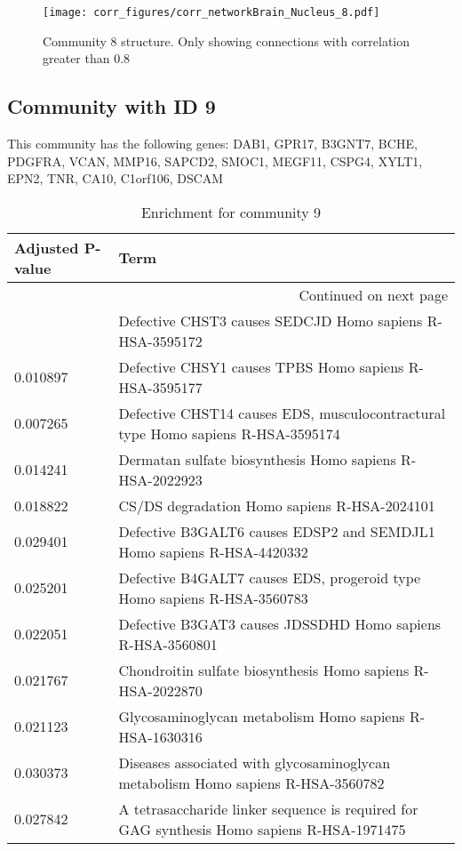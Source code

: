 \begin{figure}[h!]
\centering
\texttt{[image: corr\_figures/corr\_networkBrain\_Nucleus\_8.pdf]}
\caption{Community 8 structure. Only showing connections with correlation greater than 0.8}
\end{figure}




\subsection*{Community with ID 9}
This community has the following genes: DAB1, GPR17, B3GNT7, BCHE, PDGFRA, VCAN, MMP16, SAPCD2, SMOC1, MEGF11, CSPG4, XYLT1, EPN2, TNR, CA10, C1orf106, DSCAM
\\
\begin{longtable}{p{2.4cm}p{14.5cm}}
\caption{Enrichment for community 9}\\
\toprule
Adjusted \newline P-value &                                                                                        Term \\
\midrule
\endhead
\midrule
\multicolumn{2}{r}{{Continued on next page}} \\
\midrule
\endfoot

\bottomrule
\endlastfoot
                 0.021794 &                                    Defective CHST3 causes SEDCJD Homo sapiens R-HSA-3595172 \\
                 0.010897 &                                      Defective CHSY1 causes TPBS Homo sapiens R-HSA-3595177 \\
                 0.007265 &            Defective CHST14 causes EDS, musculocontractural type Homo sapiens R-HSA-3595174 \\
                 0.014241 &                                    Dermatan sulfate biosynthesis Homo sapiens R-HSA-2022923 \\
                 0.018822 &                                                CS/DS degradation Homo sapiens R-HSA-2024101 \\
                 0.029401 &                       Defective B3GALT6 causes EDSP2 and SEMDJL1 Homo sapiens R-HSA-4420332 \\
                 0.025201 &                     Defective B4GALT7 causes EDS, progeroid type Homo sapiens R-HSA-3560783 \\
                 0.022051 &                                  Defective B3GAT3 causes JDSSDHD Homo sapiens R-HSA-3560801 \\
                 0.021767 &                                 Chondroitin sulfate biosynthesis Homo sapiens R-HSA-2022870 \\
                 0.021123 &                                     Glycosaminoglycan metabolism Homo sapiens R-HSA-1630316 \\
                 0.030373 &            Diseases associated with glycosaminoglycan metabolism Homo sapiens R-HSA-3560782 \\
                 0.027842 &  A tetrasaccharide linker sequence is required for GAG synthesis Homo sapiens R-HSA-1971475 \\
\end{longtable}


